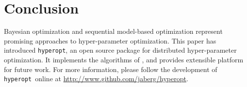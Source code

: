 \documentclass{article}
\newcommand{\hyperopt}{{\tt hyperopt}}
\begin{document}
\section{Conclusion}

Bayesian optimization and sequential model-based optimization represent
promising approaches to hyper-parameter optimization.
This paper has introduced \hyperopt, an open source package for
distributed hyper-parameter
optimization. It implements the algorithms of \cite{nipspaper},
and provides extensible platform for future work.
For more information, please follow the development of \hyperopt\ online at
\url{http://www.github.com/jaberg/hyperopt}.

\small


\end{document}
